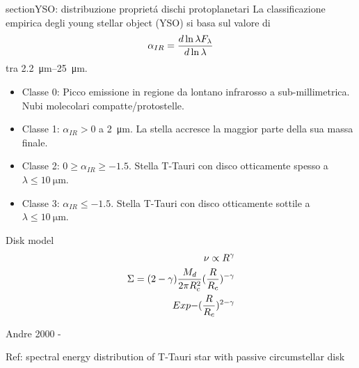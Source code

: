 \begin{workout}
	section{YSO: distribuzione propriet\'a dischi protoplanetari}
	La classificazione empirica degli young stellar object (YSO) si basa sul valore di
	\begin{equation}
	\alpha_{IR}=\frac{d \ln{\lambda F_{\lambda}}}{d \ln{\lambda}}
	\end{equation}
	tra \SIrange{2.2}{25}{\micro\meter}.
	\begin{itemize}
		\item Classe 0: Picco emissione in regione da lontano infrarosso a sub-millimetrica. Nubi molecolari compatte/protostelle.
		\item Classe 1: $\alpha_{IR}>0$ a \SI{2}{\micro\meter}. La stella accresce la maggior parte della sua massa finale.
		\item Classe 2: $0\geq\alpha_{IR}\geq-1.5$. Stella T-Tauri con disco otticamente spesso a $\lambda\leq\SI{10}{\micro\meter}$.
		\item Classe 3: $\alpha_{IR}\leq-1.5$. Stella T-Tauri con disco otticamente sottile a $\lambda\leq\SI{10}{\micro\meter}$.
	\end{itemize}
\end{workout}

\begin{workout}
	Disk model
	\begin{align}
		\nu\propto R^{\gamma}\\
		\Sigma=(2-\gamma)\frac{M_d}{2\pi R_c^2}(\frac{R}{R_c})^{-\gamma}\\Exp{-(\frac{R}{R_c})^{2-\gamma}}
	\end{align}
\end{workout}


\begin{workout}
	Andre 2000 - 
\end{workout}

\begin{workout}
	Ref: spectral energy distribution of T-Tauri star with passive circumstellar disk
\end{workout}

